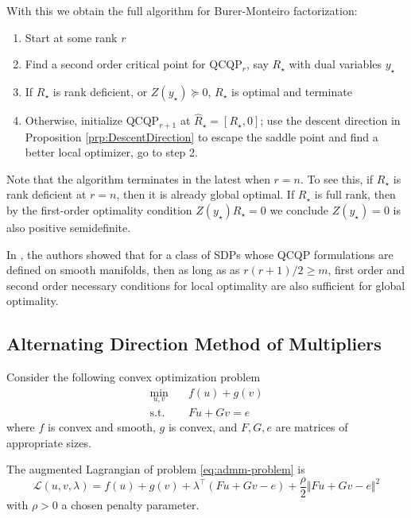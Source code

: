 \documentclass[
]{book}
\theoremstyle{definition}
\theoremstyle{definition}
\theoremstyle{definition}
\theoremstyle{definition}
\theoremstyle{remark}
\begin{document}
With this we obtain the full algorithm for Burer-Monteiro factorization:

\begin{enumerate}
\def\labelenumi{\arabic{enumi}.}
\item
  Start at some rank \(r\)
\item
  Find a second order critical point for QCQP\(_r\), say \(R_\star\) with dual variables \(y_\star\)
\item
  If \(R_\star\) is rank deficient, or \(Z(y_\star) \succeq 0\), \(R_\star\) is optimal and terminate
\item
  Otherwise, initialize QCQP\(_{r+1}\) at \(\hat{R}_{\star}=[R_\star,0]\); use the descent direction in Proposition \ref{prp:DescentDirection} to escape the saddle point and find a better local optimizer, go to step 2.
\end{enumerate}

Note that the algorithm terminates in the latest when \(r=n\). To see this, if \(R_\star\) is rank deficient at \(r=n\), then it is already global optimal. If \(R_\star\) is full rank, then by the first-order optimality condition \(Z(y_\star) R_\star = 0\) we conclude \(Z(y_\star)=0\) is also positive semidefinite.

In \citep{boumal16nips-non}, the authors showed that for a class of SDPs whose QCQP formulations are defined on smooth manifolds, then as long as as \(r(r+1)/2 \geq m\), first order and second order necessary conditions for local optimality are also sufficient for global optimality.

\subsection{Alternating Direction Method of Multipliers}\label{alternating-direction-method-of-multipliers}

Consider the following convex optimization problem
\begin{equation}
\begin{split}
\min_{u,v} & \quad f(u) + g(v) \\
\mathrm{s.t.}& \quad Fu + Gv = e
\end{split}
\label{eq:admm-problem}
\end{equation}
where \(f\) is convex and smooth, \(g\) is convex, and \(F,G,e\) are matrices of appropriate sizes.

The augmented Lagrangian of problem \eqref{eq:admm-problem} is
\begin{equation}
\mathcal{L}(u,v,\lambda) = f(u) + g(v) + \lambda^\top(Fu + Gv - e) + \frac{\rho}{2}\Vert Fu + Gv - e \Vert^2
\label{eq:admm-augmented-Lagrangian}
\end{equation}
with \(\rho > 0\) a chosen penalty parameter.
\end{document}
